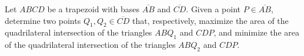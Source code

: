 Let $ABCD$ be a trapezoid with bases $\overline{AB}$ and $\overline{CD}$.
Given a point $P \in \overline{AB}$,
determine two points $Q_{1}, Q_{2} \in \overline{CD}$ that, respectively,
maximize the area of the quadrilateral intersection of the triangles $A B Q_{1}$ and $CDP$,
and minimize the area of the quadrilateral intersection of the triangles $A B Q_{2}$ and $CDP$.
